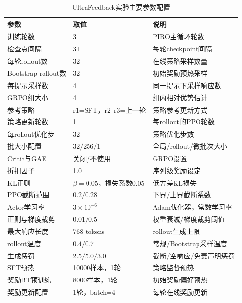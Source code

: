 \begin{table}[htbp]
    \centering
    \caption{UltraFeedback实验主要参数配置}
    \label{tab:hyperparams_uf}
    \footnotesize
    \renewcommand{\arraystretch}{1.08}
    \setlength{\tabcolsep}{6pt}
    \begin{tabular*}{0.98\textwidth}{@{\extracolsep{\fill}}lll@{}}
        \toprule
        \textbf{参数} & \textbf{取值} & \textbf{说明} \\
        \midrule
        训练轮数 & 3 & PIRO主循环轮数 \\
        检查点间隔 & 31 & 每轮checkpoint间隔 \\
        每轮rollout数 & 32 & 在线策略采样数量 \\
        Bootstrap rollout数 & 32 & 初始奖励预热采样 \\
        每提示采样数 & 4 & 同一提示下采样响应数 \\
        GRPO组大小 & 4 & 组内相对优势估计 \\
        参考策略 & r1=SFT，r2--r3=上一轮 & 策略参考更新方式 \\
        \midrule
        策略更新轮数 & 1 & 每rollout的PPO轮数 \\
        每rollout优化步 & 32 & 策略优化步数 \\
        批大小配置 & $32/256/1$ & 全局/rollout/微批次大小 \\
        Critic与GAE & 关闭/不使用 & GRPO设置 \\
        折扣因子 & 1.0 & 序列级奖励设定 \\
        KL正则 & $\beta=0.05$，损失系数0.05 & 低方差KL损失 \\
        PPO截断范围 & $0.2/0.28$ & 下界/上界截断系数 \\
        Actor学习率 & $3\times10^{-6}$ & Adam优化器，常数学习率 \\
        正则与梯度裁剪 & $0.01/0.5$ & 权重衰减/梯度裁剪阈值 \\
        \midrule
        最大响应长度 & 768 tokens & rollout生成上限 \\
        rollout温度 & $0.4/0.7$ & 常规/Bootstrap采样温度 \\
        生成惩罚 & $2.5/5.0/3.0$ & 截断/空响应/免责声明惩罚 \\
        \midrule
        SFT预热 & 10000样本，1轮 & 策略监督预热 \\
        奖励BT预训练 & 8000样本，1轮 & 初始奖励偏好预热 \\
        奖励更新配置 & 1轮，batch=4 & 每轮在线奖励更新 \\

\end{tabular*}
\end{table}
